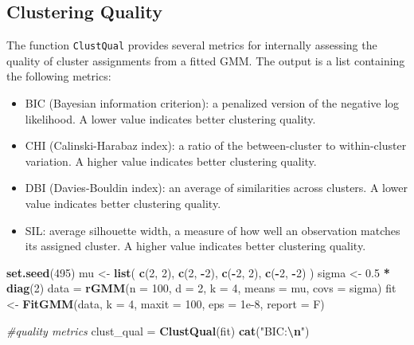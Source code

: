 \documentclass[12pt]{article}
\newenvironment{Shaded}{\begin{snugshade}}{\end{snugshade}}
\newcommand{\AttributeTok}[1]{\textcolor[rgb]{0.13,0.29,0.53}{#1}}
\newcommand{\CommentTok}[1]{\textcolor[rgb]{0.56,0.35,0.01}{\textit{#1}}}
\newcommand{\DecValTok}[1]{\textcolor[rgb]{0.00,0.00,0.81}{#1}}
\newcommand{\FloatTok}[1]{\textcolor[rgb]{0.00,0.00,0.81}{#1}}
\newcommand{\FunctionTok}[1]{\textcolor[rgb]{0.13,0.29,0.53}{\textbf{#1}}}
\newcommand{\NormalTok}[1]{#1}
\newcommand{\OtherTok}[1]{\textcolor[rgb]{0.56,0.35,0.01}{#1}}
\newcommand{\SpecialCharTok}[1]{\textcolor[rgb]{0.81,0.36,0.00}{\textbf{#1}}}
\newcommand{\StringTok}[1]{\textcolor[rgb]{0.31,0.60,0.02}{#1}}
\begin{document}
\hypertarget{clustering-quality}{%
\subsection{Clustering Quality}\label{clustering-quality}}

The function \texttt{ClustQual} provides several metrics for internally
assessing the quality of cluster assignments from a fitted GMM. The
output is a list containing the following metrics:

\begin{itemize}
\item
  BIC (Bayesian information criterion): a penalized version of the
  negative log likelihood. A lower value indicates better clustering
  quality.
\item
  CHI (Calinski-Harabaz index): a ratio of the between-cluster to
  within-cluster variation. A higher value indicates better clustering
  quality.
\item
  DBI (Davies-Bouldin index): an average of similarities across
  clusters. A lower value indicates better clustering quality.
\item
  SIL: average silhouette width, a measure of how well an observation
  matches its assigned cluster. A higher value indicates better
  clustering quality.
\end{itemize}

\begin{Shaded}
\begin{Highlighting}[]
\FunctionTok{set.seed}\NormalTok{(}\DecValTok{495}\NormalTok{)}
\NormalTok{mu }\OtherTok{\textless{}{-}} \FunctionTok{list}\NormalTok{(}
  \FunctionTok{c}\NormalTok{(}\DecValTok{2}\NormalTok{, }\DecValTok{2}\NormalTok{),}
  \FunctionTok{c}\NormalTok{(}\DecValTok{2}\NormalTok{, }\SpecialCharTok{{-}}\DecValTok{2}\NormalTok{),}
  \FunctionTok{c}\NormalTok{(}\SpecialCharTok{{-}}\DecValTok{2}\NormalTok{, }\DecValTok{2}\NormalTok{),}
  \FunctionTok{c}\NormalTok{(}\SpecialCharTok{{-}}\DecValTok{2}\NormalTok{, }\SpecialCharTok{{-}}\DecValTok{2}\NormalTok{)}
\NormalTok{)}
\NormalTok{sigma }\OtherTok{\textless{}{-}} \FloatTok{0.5} \SpecialCharTok{*} \FunctionTok{diag}\NormalTok{(}\DecValTok{2}\NormalTok{)}
\NormalTok{data }\OtherTok{=} \FunctionTok{rGMM}\NormalTok{(}\AttributeTok{n =} \DecValTok{100}\NormalTok{, }\AttributeTok{d =} \DecValTok{2}\NormalTok{, }\AttributeTok{k =} \DecValTok{4}\NormalTok{, }\AttributeTok{means =}\NormalTok{ mu, }\AttributeTok{covs =}\NormalTok{ sigma)}
\NormalTok{fit }\OtherTok{\textless{}{-}} \FunctionTok{FitGMM}\NormalTok{(data, }\AttributeTok{k =} \DecValTok{4}\NormalTok{, }\AttributeTok{maxit =} \DecValTok{100}\NormalTok{, }\AttributeTok{eps =} \FloatTok{1e{-}8}\NormalTok{, }\AttributeTok{report =}\NormalTok{ F)}

\CommentTok{\#quality metrics}
\NormalTok{clust\_qual }\OtherTok{=} \FunctionTok{ClustQual}\NormalTok{(fit)}
\FunctionTok{cat}\NormalTok{(}\StringTok{"BIC:}\SpecialCharTok{\textbackslash{}n}\StringTok{"}\NormalTok{)}
\end{Highlighting}
\end{Shaded}
\end{document}
